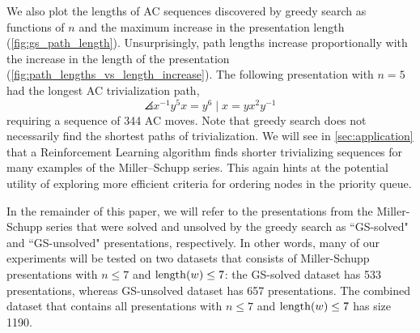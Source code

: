 We also plot the lengths of AC sequences discovered by greedy search as functions of $n$ and the maximum increase in the presentation length (\autoref{fig:gs_path_length}).
Unsurprisingly, path lengths increase proportionally with the increase in the length of the presentation (\autoref{fig:path_lengths_vs_length_increase}).
The following presentation with $n=5$ had the longest AC trivialization path,
\[
\angles{x^{-1} y^5 x = y^6 \mid  x = y x^2 y^{-1}}
\]
requiring a sequence of 344 AC moves.
Note that greedy search does not necessarily find the shortest paths of trivialization.
We will see in \autoref{sec:application} that a Reinforcement Learning algorithm finds shorter trivializing sequences for many examples of the Miller--Schupp series.
This again hints at the potential utility of exploring more efficient criteria for ordering nodes in the priority queue.

In the remainder of this paper, we will refer to the presentations from the Miller-Schupp series that were solved and unsolved by the greedy search as ``GS-solved" and ``GS-unsolved" presentations, respectively. In other words, many of our experiments will be tested on two datasets that consists of Miller-Schupp presentations with $n \leq 7$ and $\operatorname{length}(w) \leq 7$: the GS-solved dataset has 533 presentations, whereas GS-unsolved dataset has 657 presentations. The combined dataset that contains all presentations with $n \leq 7$ and $\operatorname{length}(w) \leq 7$ has size 1190.


